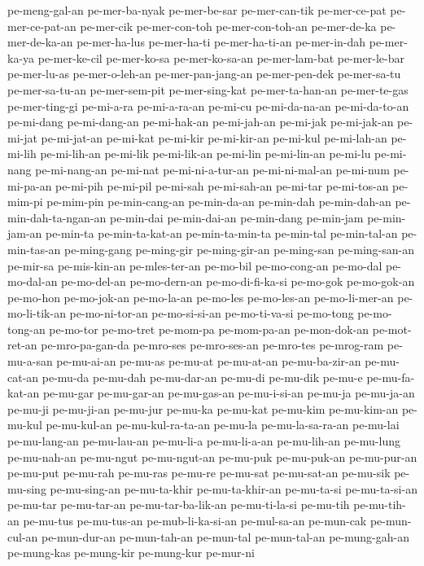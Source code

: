 {pe-meng-gal-an pe-mer-ba-nyak pe-mer-be-sar pe-mer-can-tik pe-mer-ce-pat
pe-mer-ce-pat-an pe-mer-cik pe-mer-con-toh pe-mer-con-toh-an pe-mer-de-ka
pe-mer-de-ka-an pe-mer-ha-lus pe-mer-ha-ti pe-mer-ha-ti-an pe-mer-in-dah
pe-mer-ka-ya pe-mer-ke-cil pe-mer-ko-sa pe-mer-ko-sa-an pe-mer-lam-bat
pe-mer-le-bar pe-mer-lu-as pe-mer-o-leh-an pe-mer-pan-jang-an
pe-mer-pen-dek pe-mer-sa-tu pe-mer-sa-tu-an pe-mer-sem-pit pe-mer-sing-kat
pe-mer-ta-han-an pe-mer-te-gas pe-mer-ting-gi pe-mi-a-ra pe-mi-a-ra-an
pe-mi-cu pe-mi-da-na-an pe-mi-da-to-an pe-mi-dang pe-mi-dang-an
pe-mi-hak-an pe-mi-jah-an pe-mi-jak pe-mi-jak-an pe-mi-jat pe-mi-jat-an
pe-mi-kat pe-mi-kir pe-mi-kir-an pe-mi-kul pe-mi-lah-an pe-mi-lih
pe-mi-lih-an pe-mi-lik pe-mi-lik-an pe-mi-lin pe-mi-lin-an pe-mi-lu
pe-mi-nang pe-mi-nang-an pe-mi-nat pe-mi-ni-a-tur-an pe-mi-ni-mal-an
pe-mi-num pe-mi-pa-an pe-mi-pih pe-mi-pil pe-mi-sah pe-mi-sah-an pe-mi-tar
pe-mi-tos-an pe-mim-pi pe-mim-pin pe-min-cang-an pe-min-da-an pe-min-dah
pe-min-dah-an pe-min-dah-ta-ngan-an pe-min-dai pe-min-dai-an pe-min-dang
pe-min-jam pe-min-jam-an pe-min-ta pe-min-ta-kat-an pe-min-ta-min-ta
pe-min-tal pe-min-tal-an pe-min-tas-an pe-ming-gang pe-ming-gir
pe-ming-gir-an pe-ming-san pe-ming-san-an pe-mir-sa pe-mis-kin-an
pe-mles-ter-an pe-mo-bil pe-mo-cong-an pe-mo-dal pe-mo-dal-an pe-mo-del-an
pe-mo-dern-an pe-mo-di-fi-ka-si pe-mo-gok pe-mo-gok-an pe-mo-hon
pe-mo-jok-an pe-mo-la-an pe-mo-les pe-mo-les-an pe-mo-li-mer-an
pe-mo-li-tik-an pe-mo-ni-tor-an pe-mo-si-si-an pe-mo-ti-va-si pe-mo-tong
pe-mo-tong-an pe-mo-tor pe-mo-tret pe-mom-pa pe-mom-pa-an pe-mon-dok-an
pe-mot-ret-an pe-mro-pa-gan-da pe-mro-ses pe-mro-ses-an pe-mro-tes
pe-mrog-ram pe-mu-a-san pe-mu-ai-an pe-mu-as pe-mu-at pe-mu-at-an
pe-mu-ba-zir-an pe-mu-cat-an pe-mu-da pe-mu-dah pe-mu-dar-an pe-mu-di
pe-mu-dik pe-mu-e pe-mu-fa-kat-an pe-mu-gar pe-mu-gar-an pe-mu-gas-an
pe-mu-i-si-an pe-mu-ja pe-mu-ja-an pe-mu-ji pe-mu-ji-an pe-mu-jur pe-mu-ka
pe-mu-kat pe-mu-kim pe-mu-kim-an pe-mu-kul pe-mu-kul-an pe-mu-kul-ra-ta-an
pe-mu-la pe-mu-la-sa-ra-an pe-mu-lai pe-mu-lang-an pe-mu-lau-an pe-mu-li-a
pe-mu-li-a-an pe-mu-lih-an pe-mu-lung pe-mu-nah-an pe-mu-ngut
pe-mu-ngut-an pe-mu-puk pe-mu-puk-an pe-mu-pur-an pe-mu-put pe-mu-rah
pe-mu-ras pe-mu-re pe-mu-sat pe-mu-sat-an pe-mu-sik pe-mu-sing
pe-mu-sing-an pe-mu-ta-khir pe-mu-ta-khir-an pe-mu-ta-si pe-mu-ta-si-an
pe-mu-tar pe-mu-tar-an pe-mu-tar-ba-lik-an pe-mu-ti-la-si pe-mu-tih
pe-mu-tih-an pe-mu-tus pe-mu-tus-an pe-mub-li-ka-si-an pe-mul-sa-an
pe-mun-cak pe-mun-cul-an pe-mun-dur-an pe-mun-tah-an pe-mun-tal
pe-mun-tal-an pe-mung-gah-an pe-mung-kas pe-mung-kir pe-mung-kur pe-mur-ni
}
